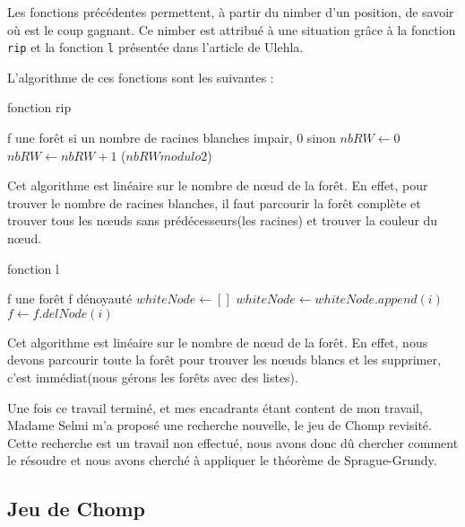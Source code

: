 Les fonctions précédentes permettent, à partir du nimber d'un position, de savoir où est le coup gagnant. Ce nimber est attribué à une situation grâce à la fonction \texttt{rip} et la fonction \texttt{l} présentée dans l'article de Ulehla.

L'algorithme de ces fonctions sont les suivantes :
\clearpage
\begin{algorithm}[hbt]
  \caption{fonction rip}
    \begin{algorithmic}
    \REQUIRE f une forêt
     si un nombre de racines blanches impair, 0 sinon
    \STATE $nbRW \leftarrow 0$
        \STATE $nbRW \leftarrow nbRW + 1$
      \ENDIF
    \ENDFOR
    \RETURN ($nbRW modulo 2$)
  \end{algorithmic}
\end{algorithm}    

Cet algorithme est linéaire sur le nombre de nœud de la forêt. En effet, pour trouver le nombre de racines blanches, il faut parcourir la forêt complète et trouver tous les nœuds sans prédécesseurs(les racines) et trouver la couleur du nœud.

\begin{algorithm}[hbt]
  \caption{fonction l}
  \begin{algorithmic}
    \REQUIRE f une forêt
    \ENSURE f dénoyauté
    \STATE $whiteNode \leftarrow []$
        \STATE $whiteNode \leftarrow whiteNode.append(i)$
      \ENDIF
    \ENDFOR
      \STATE $f \leftarrow f.delNode(i)$
    \ENDFOR
  \end{algorithmic}
\end{algorithm}

Cet algorithme est linéaire sur le nombre de nœud de la forêt. En effet, nous devons parcourir toute la forêt pour trouver les nœuds blancs et les supprimer, c'est immédiat(nous gérons les forêts avec des listes).

Une fois ce travail terminé, et mes encadrants étant content de mon travail, Madame Selmi m'a proposé une recherche nouvelle, le jeu de Chomp revisité. Cette recherche est un travail non effectué, nous avons donc dû chercher comment le résoudre et nous avons cherché à appliquer le théorème de Sprague-Grundy.

\subsection{Jeu de Chomp}
\label{sub:Jeu de Chomp}

